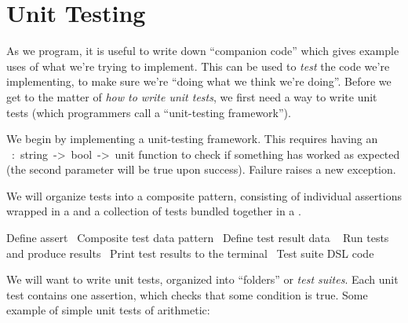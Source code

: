 
\chapter{Unit Testing}

As we program, it is useful to write down ``companion code'' which gives
example uses of what we're trying to implement. This can be used to
\emph{test} the code we're implementing, to make sure we're ``doing what
we think we're doing''. Before we get to the matter of \emph{how to
write unit tests}, we first need a way to write unit tests (which
programmers call a ``unit-testing framework'').

We begin by implementing a unit-testing framework. This requires having
an {\Tt{}\ :\ string\ ->\ bool\ ->\ unit\nwendquote} function to check if something
has worked as expected (the second parameter will be {\Tt{}true\nwendquote} upon success).
Failure raises a new exception.

We will organize tests into a composite pattern, consisting of
individual assertions wrapped in a {\Tt{}\nwendquote} and a collection of
tests bundled together in a {\Tt{}\nwendquote}.

\nwenddocs{}\endmoddef\nwstartdeflinemarkup\nwenddeflinemarkup
\LA{}Define \code{}assert\edoc{}~{\nwtagstyle{}}\RA{}
\LA{}Composite test data pattern~{\nwtagstyle{}}\RA{}
\LA{}Define test result data ~{\nwtagstyle{}}\RA{}
\LA{}Run tests and produce results~{\nwtagstyle{}}\RA{}
\LA{}Print test results to the terminal~{\nwtagstyle{}}\RA{}
\LA{}Test suite DSL code~{\nwtagstyle{}}\RA{}
\nwendcode{}\nwdocspar

We will want to write unit tests, organized into ``folders'' or
\emph{test suites}. Each unit test contains one assertion, which checks
that some condition is true. Some example of simple unit tests of
arithmetic:

